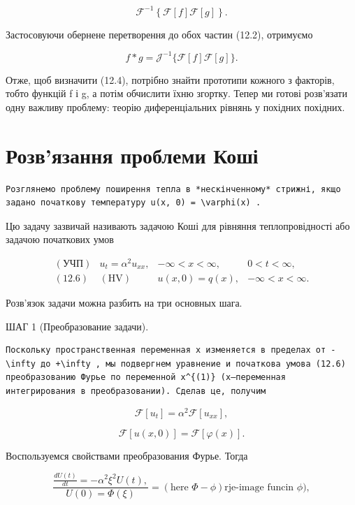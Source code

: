 \documentclass[
  ukrainian,
]{article}
\begin{document}
\[
\mathcal{F}^{-1}\left\{\mathcal{F}\left[f\right]\mathcal{F}\left[g\right]\right\}.
\]

Застосовуючи обернене перетворення до обох частин (12.2), отримуємо

\[
f * g = \mathcal{J}^{-1} \{ \mathcal{F} [f] \mathcal{F} [g] \}.
\]

Отже, щоб визначити (12.4), потрібно знайти прототипи кожного з
факторів, тобто функцій f і g, а потім обчислити їхню згортку. Тепер ми
готові розв'язати одну важливу проблему: теорію диференціальних рівнянь
у похідних похідних.

\section{Розв'язання проблеми
Коші}\label{ux440ux43eux437ux432ux44fux437ux430ux43dux43dux44f-ux43fux440ux43eux431ux43bux435ux43cux438-ux43aux43eux448ux456}

\begin{verbatim}
Розглянемо проблему поширення тепла в *нескінченному* стрижні, якщо задано початкову температуру u(x, 0) = \varphi(x) .
\end{verbatim}

Цю задачу зазвичай називають задачою Коші для рівняння теплопровідності
або задачою початкових умов

\[
\begin{aligned} (\text{УЧП}) & u_t = \alpha^2 u_{xx}, & -\infty < x < \infty, & 0 < t < \infty, \\ (\text{12.6}) & (\text{HV}) & u(x,0) = q(x), & -\infty < x < \infty. \end{aligned}
\]

Розв'язок задачи можна разбить на три основных шага.

ШАГ 1 (Преобразование задачи).

\begin{verbatim}
Поскольку пространственная переменная x изменяется в пределах от -\infty до +\infty , мы подвергнем уравнение и початкова умова (12.6) преобразованию Фурье по переменной x^{(1)} (x—переменная интегрирования в преобразовании). Сделав це, получим
\end{verbatim}

\[
\mathcal{F}[u_t] = \alpha^2 \mathcal{F}[u_{xx}],
\]

\[
\mathcal{F}[u(x, 0)] = \mathcal{F}[\varphi(x)].
\]

Воспользуемся свойствами преобразования Фурье. Тогда

\[
\frac{\frac{dU(t)}{dt} = -\alpha^2 \xi^2 U(t), }{U(0) = \Phi(\xi)} = (\text{here } \Phi - \phi) \text{rje-image funcin } \phi),
\]
\end{document}
